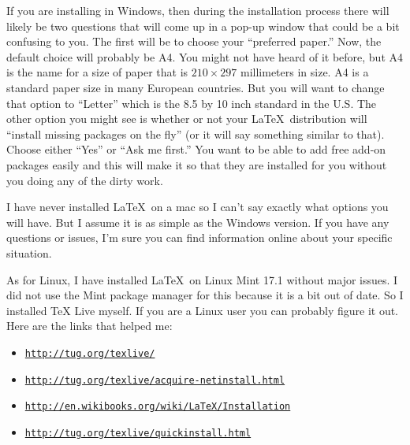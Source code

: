 \documentclass[11pt]{article}
\begin{document}
If you are installing in Windows, then during the installation process there will likely be two questions that will come up in a pop-up window that could be a bit confusing to you. The first will be to choose your ``preferred paper.''  Now, the default choice will probably be A4.  You might not have heard of it before, but A4 is the name for a size of paper that is $210\times 297$ millimeters in size.  A4 is a standard paper size in many European countries.  But you will want to change that option to ``Letter'' which is the 8.5 by 10 inch standard in the U.S. The other option you might see is whether or not your \LaTeX\ distribution will ``install missing packages on the fly'' (or it will say something similar to that).  Choose either ``Yes'' or ``Ask me first.''  You want to be able to add free add-on packages easily and this will make it so that they are installed for you without you doing any of the dirty work.  

I have never installed \LaTeX\ on a mac so I can't say exactly what options you will have.  But I assume it is as simple as the Windows version.  If you have any questions or issues, I'm sure you can find information online about your specific situation.

As for Linux, I have installed \LaTeX\ on Linux Mint 17.1 without major issues.  I did not use the Mint package manager for this because it is a bit out of date.  So I installed TeX Live myself.  If you are a Linux user you can probably figure it out.  Here are the links that helped me:

\begin{itemize}
\item \href{http://tug.org/texlive/}{\texttt{http://tug.org/texlive/}}
\item \href{http://tug.org/texlive/acquire-netinstall.html}{\texttt{http://tug.org/texlive/acquire-netinstall.html}}
\item \href{http://en.wikibooks.org/wiki/LaTeX/Installation}{\texttt{http://en.wikibooks.org/wiki/LaTeX/Installation}}
\item \href {http://tug.org/texlive/quickinstall.html}{\texttt{http://tug.org/texlive/quickinstall.html}}
\end{itemize}
\end{document}
